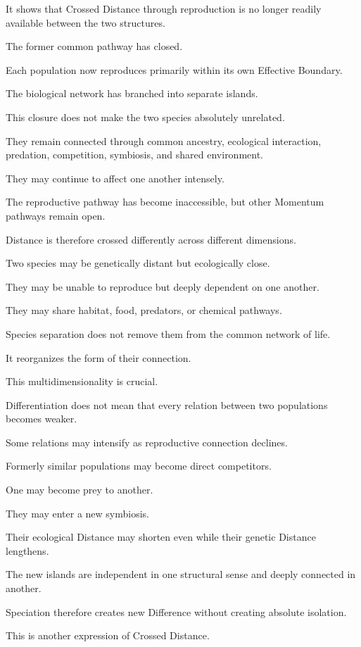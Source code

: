 It shows that Crossed Distance through reproduction is no longer readily available between the two structures.

The former common pathway has closed.

Each population now reproduces primarily within its own Effective Boundary.

The biological network has branched into separate islands.

This closure does not make the two species absolutely unrelated.

They remain connected through common ancestry, ecological interaction, predation, competition, symbiosis, and shared environment.

They may continue to affect one another intensely.

The reproductive pathway has become inaccessible, but other Momentum pathways remain open.

Distance is therefore crossed differently across different dimensions.

Two species may be genetically distant but ecologically close.

They may be unable to reproduce but deeply dependent on one another.

They may share habitat, food, predators, or chemical pathways.

Species separation does not remove them from the common network of life.

It reorganizes the form of their connection.

This multidimensionality is crucial.

Differentiation does not mean that every relation between two populations becomes weaker.

Some relations may intensify as reproductive connection declines.

Formerly similar populations may become direct competitors.

One may become prey to another.

They may enter a new symbiosis.

Their ecological Distance may shorten even while their genetic Distance lengthens.

The new islands are independent in one structural sense and deeply connected in another.

Speciation therefore creates new Difference without creating absolute isolation.

This is another expression of Crossed Distance.

